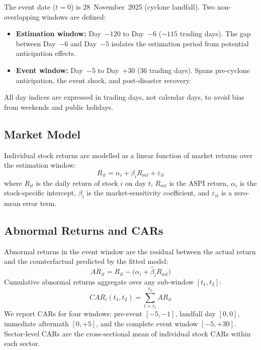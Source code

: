 \documentclass[sigconf, nonacm]{acmart}
\begin{document}
The event date ($t=0$) is 28~November~2025 (cyclone landfall). Two
non-overlapping windows are defined:
\begin{itemize}
  \item \textbf{Estimation window:} Day~$-120$ to Day~$-6$
        (${\sim}115$ trading days). The gap between Day~$-6$ and Day~$-5$
        isolates the estimation period from potential anticipation effects.
  \item \textbf{Event window:} Day~$-5$ to Day~$+30$ (36 trading days).
        Spans pre-cyclone anticipation, the event shock, and post-disaster
        recovery.
\end{itemize}

All day indices are expressed in trading days, not calendar days, to avoid
bias from weekends and public holidays.

\subsection{Market Model}

Individual stock returns are modelled as a linear function of market
returns over the estimation window:
\begin{equation}
  R_{it} = \alpha_i + \beta_i R_{mt} + \varepsilon_{it}
  \label{eq:market-model}
\end{equation}
where $R_{it}$ is the daily return of stock $i$ on day $t$, $R_{mt}$ is
the ASPI return, $\alpha_i$ is the stock-specific intercept, $\beta_i$ is
the market-sensitivity coefficient, and $\varepsilon_{it}$ is a zero-mean
error term.

\subsection{Abnormal Returns and CARs}

Abnormal returns in the event window are the residual between the actual
return and the counterfactual predicted by the fitted model:
\begin{equation}
  AR_{it} = R_{it} - \bigl(\hat{\alpha}_i + \hat{\beta}_i R_{mt}\bigr)
\end{equation}
Cumulative abnormal returns aggregate over any sub-window $[t_1, t_2]$:
\begin{equation}
  CAR_i(t_1, t_2) = \sum_{t=t_1}^{t_2} AR_{it}
\end{equation}
We report CARs for four windows: pre-event $[-5,-1]$, landfall day $[0,0]$,
immediate aftermath $[0,+5]$, and the complete event window $[-5,+30]$.
Sector-level CARs are the cross-sectional mean of individual stock CARs
within each sector.
\end{document}
